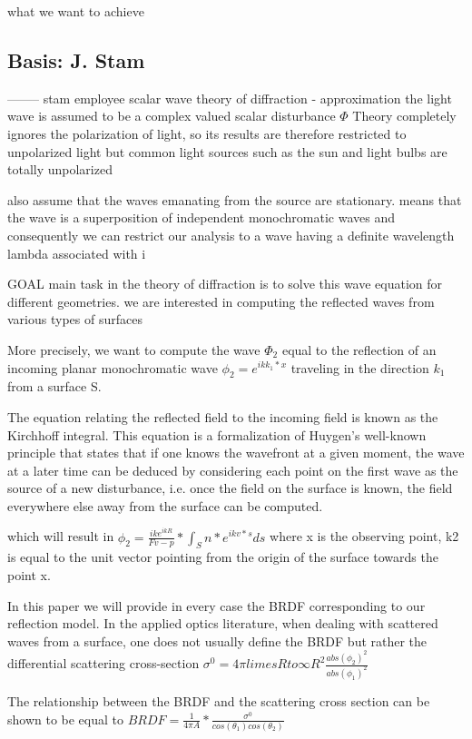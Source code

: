 what we want to achieve

\subsection{Basis: J. Stam}
--------
stam employee scalar wave theory of diffraction - approximation the light wave is assumed to be a complex valued scalar disturbance $\Phi$
Theory completely ignores the polarization of light, so its results are therefore restricted to unpolarized light but common light sources such as the sun and light bulbs are totally unpolarized

also assume that the waves emanating from the source are stationary. means that the wave is a superposition of independent monochromatic waves and consequently we can restrict our analysis to a wave having a definite wavelength lambda associated with i

GOAL
main task in the theory of diffraction is to solve this wave equation for different geometries.
we are interested in computing the reflected waves from various types of surfaces

More precisely, we want to compute the wave $\Phi_2$ equal to the reflection of an incoming planar monochromatic wave $\phi_2 = e^{ik k_1 * x}$  traveling in the direction $k_1$ from a surface S.

The equation relating the reflected field to the incoming field is known as the Kirchhoff integral. This equation is a formalization of Huygen’s well-known principle that states that if one knows the wavefront at a given moment, the wave at a later time can be deduced by considering each point on the first wave as the source of a new disturbance, i.e. once the field on the surface is known, the field everywhere else away from the surface can be computed. 

which will result in $\phi_2 = \frac{ik e^{ikR}}{Fv - p}*\int_{S} n * e^{ik v * s} ds$ where x is the observing point, k2 is equal to the unit vector pointing from the origin of the surface towards the point x.

 In this paper we will provide in every case the BRDF corresponding to our reflection model. In the applied optics literature, when dealing with scattered waves from a surface, one does not usually define the BRDF but rather the differential scattering cross-section $\sigma^0 = 4\pi limes R to \infty R^2 \frac{abs(\phi_2)^2}{abs(\phi_1)^2}$

The relationship between the BRDF and the scattering cross section can be shown to be equal to $BRDF = \frac{1}{4 \pi A} * \frac{\sigma^0}{cos(\theta_1)cos(\theta_2)}$


